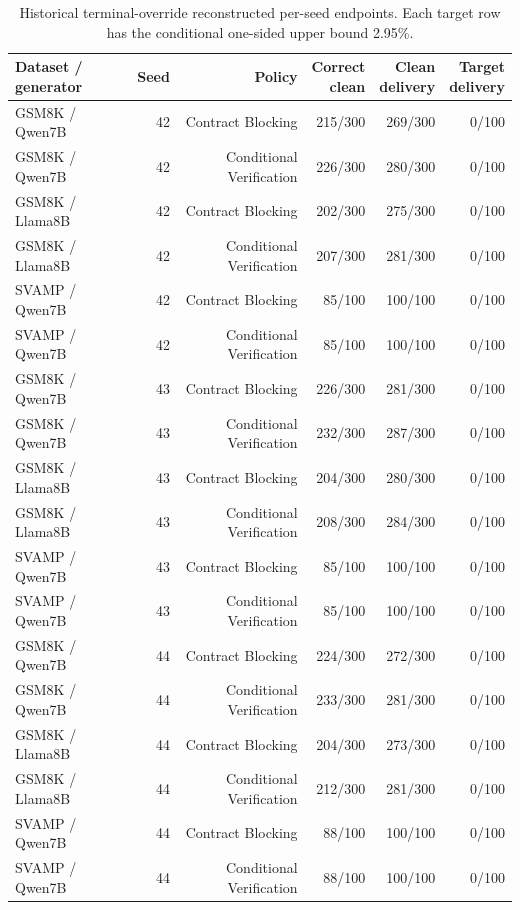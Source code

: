 \documentclass[journal,onecolumn]{IEEEtran}
\begin{document}
\begin{table}[H]
\centering
\caption{Historical terminal-override reconstructed per-seed endpoints. Each target row has the conditional one-sided upper bound 2.95\%.}\label{tab:historical}
\footnotesize
\setlength{\tabcolsep}{4pt}
\begin{tabular}{@{}lrrrrr@{}}
\toprule
Dataset / generator & Seed & Policy & \shortstack{Correct\\clean} & \shortstack{Clean\\delivery} & \shortstack{Target\\delivery}\\
\midrule
GSM8K / Qwen7B & 42 & Contract Blocking & 215/300 & 269/300 & 0/100\\
GSM8K / Qwen7B & 42 & Conditional Verification & 226/300 & 280/300 & 0/100\\
GSM8K / Llama8B & 42 & Contract Blocking & 202/300 & 275/300 & 0/100\\
GSM8K / Llama8B & 42 & Conditional Verification & 207/300 & 281/300 & 0/100\\
SVAMP / Qwen7B & 42 & Contract Blocking & 85/100 & 100/100 & 0/100\\
SVAMP / Qwen7B & 42 & Conditional Verification & 85/100 & 100/100 & 0/100\\
GSM8K / Qwen7B & 43 & Contract Blocking & 226/300 & 281/300 & 0/100\\
GSM8K / Qwen7B & 43 & Conditional Verification & 232/300 & 287/300 & 0/100\\
GSM8K / Llama8B & 43 & Contract Blocking & 204/300 & 280/300 & 0/100\\
GSM8K / Llama8B & 43 & Conditional Verification & 208/300 & 284/300 & 0/100\\
SVAMP / Qwen7B & 43 & Contract Blocking & 85/100 & 100/100 & 0/100\\
SVAMP / Qwen7B & 43 & Conditional Verification & 85/100 & 100/100 & 0/100\\
GSM8K / Qwen7B & 44 & Contract Blocking & 224/300 & 272/300 & 0/100\\
GSM8K / Qwen7B & 44 & Conditional Verification & 233/300 & 281/300 & 0/100\\
GSM8K / Llama8B & 44 & Contract Blocking & 204/300 & 273/300 & 0/100\\
GSM8K / Llama8B & 44 & Conditional Verification & 212/300 & 281/300 & 0/100\\
SVAMP / Qwen7B & 44 & Contract Blocking & 88/100 & 100/100 & 0/100\\
SVAMP / Qwen7B & 44 & Conditional Verification & 88/100 & 100/100 & 0/100\\
\bottomrule
\end{tabular}
\end{table}
\end{document}
